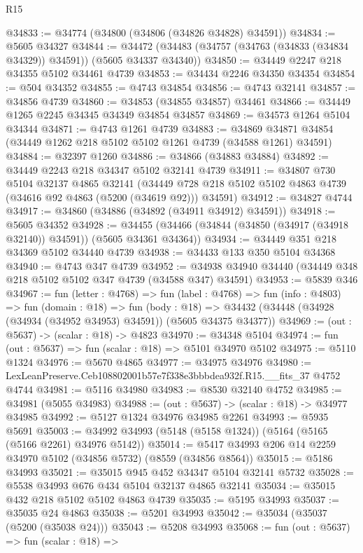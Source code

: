 \begin{lexlean}{R15}
\begin{coremodule}
{{{{{{{{{{{@34833 := @34774 (@34800 (@34806 (@34826 @34828) @34591))
@34834 := @5605 @34327
@34844 := @34472 (@34483 (@34757 (@34763 (@34833 (@34834 @34329)) @34591)) (@5605 @34337 @34340))
@34850 := @34449 @2247 @218 @34355 @5102 @34461 @4739
@34853 := @34434 @2246 @34350 @34354
@34854 := @504 @34352
@34855 := @4743 @34854
@34856 := @4743 @32141
@34857 := @34856 @4739
@34860 := @34853 (@34855 @34857) @34461
@34866 := @34449 @1265 @2245 @34345 @34349 @34854 @34857
@34869 := @34573 @1264 @5104 @34344
@34871 := @4743 @1261 @4739
@34883 := @34869 @34871 @34854 (@34449 @1262 @218 @5102 @5102 @1261 @4739 (@34588 @1261) @34591)
@34884 := @32397 @1260
@34886 := @34866 (@34883 @34884)
@34892 := @34449 @2243 @218 @34347 @5102 @32141 @4739
@34911 := @34807
    @730
    @5104
    @32137
    @4865
    @32141
    (@34449 @728 @218 @5102 @5102 @4863 @4739 (@34616 @92 @4863 (@5200 (@34619 @92))) @34591)
@34912 := @34827 @4744
@34917 := @34860 (@34886 (@34892 (@34911 @34912) @34591))
@34918 := @5605 @34352
@34928 := @34455 (@34466 (@34844 (@34850 (@34917 (@34918 @32140)) @34591)) (@5605 @34361 @34364))
@34934 := @34449 @351 @218 @34369 @5102 @34440 @4739
@34938 := @34433 @133 @350 @5104 @34368
@34940 := @4743 @347 @4739
@34952 := @34938 @34940 @34440 (@34449 @348 @218 @5102 @5102 @347 @4739 (@34588 @347) @34591)
@34953 := @5839 @346
@34967 := fun (letter : @4768) =>
  fun (label : @4768) =>
  fun (info : @4803) =>
  fun (domain : @18) =>
  fun (body : @18) => @34432 (@34448 (@34928 (@34934 (@34952 @34953) @34591)) (@5605 @34375 @34377))
@34969 := (out : @5637) -> (scalar : @18) -> @4823
@34970 := @34348 @5104
@34974 := fun (out : @5637) => fun (scalar : @18) => @5101 @34970 @5102
@34975 := @5110 @1324
@34976 := @5670 @4865
@34977 := @34975 @34976
@34980 := LexLeanPreserve.Ceb108802001b57e7f338e3bbbdea932f.R15.__fits_37 @4752 @4744
@34981 := @5116 @34980
@34983 := @8530 @32140 @4752
@34985 := @34981 (@5055 @34983)
@34988 := (out : @5637) -> (scalar : @18) -> @34977 @34985
@34992 := @5127 @1324 @34976 @34985 @2261
@34993 := @5935 @5691
@35003 := @34992 @34993 (@5148 (@5158 @1324)) (@5164 (@5165 (@5166 @2261) @34976 @5142))
@35014 := @5417 @34993 @206 @14 @2259 @34970 @5102 (@34856 @5732) (@8559 (@34856 @8564))
@35015 := @5186 @34993
@35021 := @35015 @945 @452 @34347 @5104 @32141 @5732
@35028 := @5538 @34993 @676 @434 @5104 @32137 @4865 @32141
@35034 := @35015 @432 @218 @5102 @5102 @4863 @4739
@35035 := @5195 @34993
@35037 := @35035 @24 @4863
@35038 := @5201 @34993
@35042 := @35034 (@35037 (@5200 (@35038 @24)))
@35043 := @5208 @34993
@35068 := fun (out : @5637) =>
  fun (scalar : @18) =>
}}}}}}}}}}}
\end{coremodule}
\end{lexlean}
